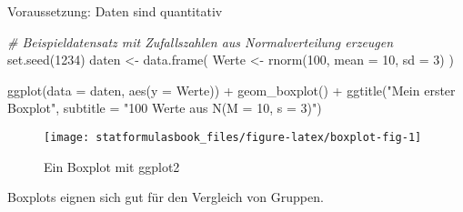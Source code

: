 \documentclass[
]{book}
\newenvironment{Shaded}{\begin{snugshade}}{\end{snugshade}}
\newcommand{\AttributeTok}[1]{\textcolor[rgb]{0.77,0.63,0.00}{#1}}
\newcommand{\CommentTok}[1]{\textcolor[rgb]{0.56,0.35,0.01}{\textit{#1}}}
\newcommand{\DecValTok}[1]{\textcolor[rgb]{0.00,0.00,0.81}{#1}}
\newcommand{\FunctionTok}[1]{\textcolor[rgb]{0.00,0.00,0.00}{#1}}
\newcommand{\NormalTok}[1]{#1}
\newcommand{\OtherTok}[1]{\textcolor[rgb]{0.56,0.35,0.01}{#1}}
\newcommand{\SpecialCharTok}[1]{\textcolor[rgb]{0.00,0.00,0.00}{#1}}
\newcommand{\StringTok}[1]{\textcolor[rgb]{0.31,0.60,0.02}{#1}}
\begin{document}
Voraussetzung: Daten sind quantitativ

\begin{Shaded}
\begin{Highlighting}[]
\CommentTok{\# Beispieldatensatz mit Zufallszahlen aus Normalverteilung erzeugen}
\FunctionTok{set.seed}\NormalTok{(}\DecValTok{1234}\NormalTok{)}
\NormalTok{daten }\OtherTok{\textless{}{-}} \FunctionTok{data.frame}\NormalTok{(}
\NormalTok{  Werte }\OtherTok{\textless{}{-}} \FunctionTok{rnorm}\NormalTok{(}\DecValTok{100}\NormalTok{, }\AttributeTok{mean =} \DecValTok{10}\NormalTok{, }\AttributeTok{sd =} \DecValTok{3}\NormalTok{) }
\NormalTok{)}

\FunctionTok{ggplot}\NormalTok{(}\AttributeTok{data =}\NormalTok{ daten, }\FunctionTok{aes}\NormalTok{(}\AttributeTok{y =}\NormalTok{ Werte)) }\SpecialCharTok{+}
  \FunctionTok{geom\_boxplot}\NormalTok{() }\SpecialCharTok{+}
  \FunctionTok{ggtitle}\NormalTok{(}\StringTok{"Mein erster Boxplot"}\NormalTok{, }\AttributeTok{subtitle =} \StringTok{"100 Werte aus N(M = 10, s = 3)"}\NormalTok{)}
\end{Highlighting}
\end{Shaded}

\begin{figure}

{\centering \texttt{[image: statformulasbook\_files/figure-latex/boxplot-fig-1]} 

}

\caption{Ein Boxplot mit ggplot2}\label{fig:boxplot-fig}
\end{figure}

Boxplots eignen sich gut für den Vergleich von Gruppen.
\end{document}
